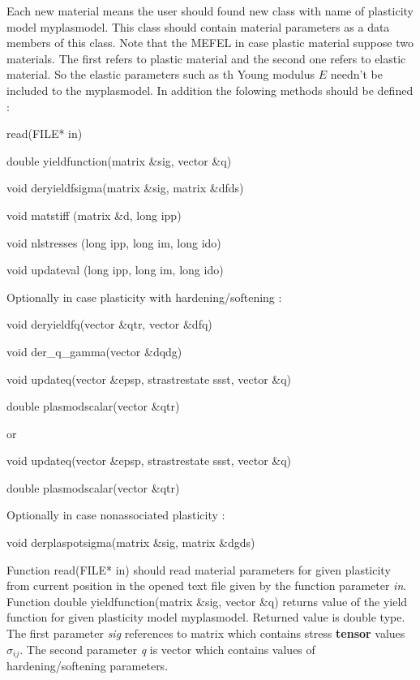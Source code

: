 Each new material means the user should found new class with name of plasticity model {\sf myplasmodel}.
This class should contain material parameters as a data members of this class. Note that the MEFEL
in case plastic material suppose two materials. The first refers to plastic material and the second
one refers to elastic material. So the elastic parameters such as th Young modulus $E$ needn't be
included to the {\sf myplasmodel}. In addition the folowing methods should be defined :
\begin{itemize}
{\sf
\item
read(FILE* in)
\item
double yieldfunction(matrix \&sig, vector \&q)
\item
void deryieldfsigma(matrix \&sig, matrix \&dfds)
\item
void matstiff (matrix \&d, long ipp)
\item
void nlstresses (long ipp, long im, long ido)
\item
void updateval (long ipp, long im, long ido)
}

Optionally in case plasticity with hardening/softening :
{\sf
\item
void deryieldfq(vector \&qtr, vector \&dfq)
\item
void der\_q\_gamma(vector \&dqdg)
\item
void updateq(vector \&epsp, strastrestate ssst, vector \&q)
\item
double plasmodscalar(vector \&qtr)
}

or
{\sf
\item
void updateq(vector \&epsp, strastrestate ssst, vector \&q)
\item
double plasmodscalar(vector \&qtr)
}

Optionally in case nonassociated plasticity :
{\sf
\item
void derplaspotsigma(matrix \&sig, matrix \&dgds)
}
\end{itemize}

Function {\sf read(FILE* in)} should read material parameters for given plasticity from current
position in the opened text file given by the function parameter {\it in}.\\

Function {\sf double yieldfunction(matrix \&sig, vector \&q)} returns value of the yield function
for given plasticity model {\sf myplasmodel}. Returned value is double type. The first parameter
{\it sig} references to matrix which contains stress {\bf tensor} values $\sigma_{ij}$. The second
parameter {\it q} is vector which contains values of hardening/softening parameters.\\

